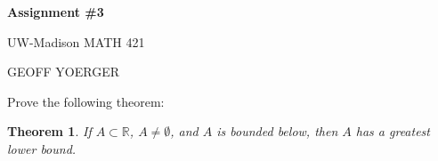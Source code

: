 \documentclass{article} %
\theoremstyle{plain}
\newtheorem*{theorem*}{Theorem}
\theoremstyle{definition}
\newcommand{\Rb}{\mathbb{R}}
\begin{document}
\begin{center}
    \Large{
        \textbf{Assignment \#3}

        UW-Madison MATH 421
    }
    
    \vspace{5pt}
        
    \normalsize{
        GEOFF YOERGER

        \usdate
    }
    
    \vspace{15pt}
\end{center}

\noindent{} Prove the following theorem:

\begin{theorem*} If $A \subset \Rb$, $A \neq \emptyset$, and $A$ is bounded below, then $A$ has a greatest lower bound. \end{theorem*}
\end{document}
